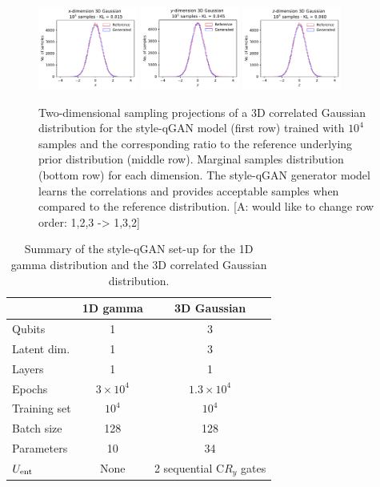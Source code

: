 \documentclass[twocolumn,preprintnumbers,superscriptaddress]{revtex4-2}
\newcommand{\commentAF}[1]{{\color{cyan} {[A: #1]}}}
\begin{document}
\begin{figure}
  \includegraphics[width=0.29\textwidth]{plots/3Dgaussian_posdef/1-distribution_3dgaussian_100k.pdf}%
  \includegraphics[width=0.29\textwidth]{plots/3Dgaussian_posdef/2-distribution_3dgaussian_100k.pdf}%
  \includegraphics[width=0.29\textwidth]{plots/3Dgaussian_posdef/3-distribution_3dgaussian_100k.pdf}

  \caption{\label{fig:3dgauss}Two-dimensional sampling projections of a 3D
  correlated Gaussian distribution for the style-qGAN model (first row) trained
  with $10^4$ samples and the corresponding ratio to the reference underlying
  prior distribution (middle row). Marginal samples distribution (bottom row)
  for each dimension. The style-qGAN generator model learns the correlations and
  provides acceptable samples when compared to the reference distribution. \commentAF{would like to change row order: 1,2,3 -> 1,3,2}}
\end{figure}

\begin{table}
  \begin{tabular}{l|c|c}
     & {\bf 1D gamma} & {\bf 3D Gaussian} \tabularnewline
    \hline
    Qubits & 1 & 3 \tabularnewline
    Latent dim. & 1 & 3 \tabularnewline
    Layers & 1 & 1 \tabularnewline
    Epochs & $3\times10^4$ & $1.3\times10^4$ \tabularnewline
    Training set & $10^4$ & $10^4$ \tabularnewline
    Batch size & 128 & 128 \tabularnewline
    Parameters & 10 & 34 \tabularnewline
    $U_{\rm ent}$ & None & 2 sequential C$R_y$ gates \tabularnewline
    \hline
  \end{tabular}

  \caption{\label{table:summary} Summary of the style-qGAN set-up for the 1D
  gamma distribution and the 3D correlated Gaussian distribution.}
\end{table}
\end{document}
